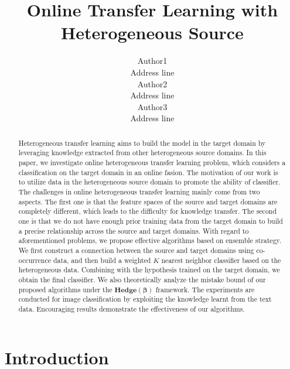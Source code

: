 \documentclass[letterpaper]{article}
\theoremstyle{remark}
\theoremstyle{definition}
\begin{document}
%
\title{Online Transfer Learning with Heterogeneous Source}
\author{Author1\\ Address line\\
\And Author2 \\ Address line\\
\And Author3 \\ Address line\\
}
\maketitle
\begin{abstract}
Heterogeneous transfer learning aims to build the model in the target domain by leveraging knowledge extracted from other heterogeneous source domains.
In this paper, we investigate online heterogeneous transfer learning problem, which considers a classification on the target domain in an online fasion.
The motivation of our work is to utilize data in the heterogeneous source domain to promote the ability of classifier.
The challenges in online heterogeneous transfer learning mainly come from two aspects.
The first one is that the feature spaces of the source and target domains are completely different, which leads to the difficulty for knowledge transfer.
The second one is that we do not have enough prior training data from the target domain to build a precise relationship across the source and target domains.
With regard to aforementioned problems, we propose effective algorithms based on ensemble strategy.
We first construct a connection between the source and target domains using co-occurrence data, and then build a weighted $K$ nearest neighbor classifier based on the heterogeneous data.
Combining with the hypothesis trained on the target domain, we obtain the final classifier.
We also theoretically analyze the mistake bound of our proposed algorithms under the $\mathbf{Hedge(\beta)}$ framework.
The experiments are conducted for image classification by exploiting the knowledge learnt from the text data.
Encouraging results demonstrate the effectiveness of our algorithms.

\end{abstract}


\section{Introduction}
\end{document}
